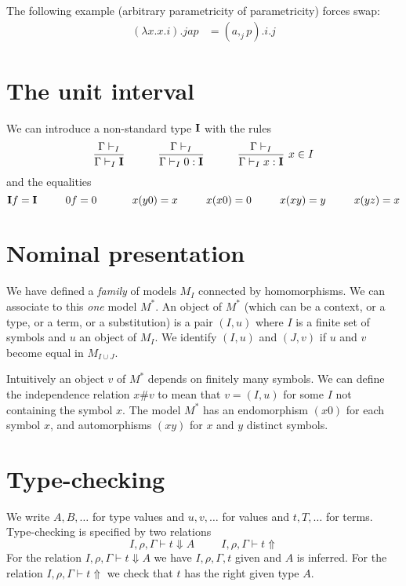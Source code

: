 \documentclass[10pt,a4paper]{article}
\newcommand{\UI}{{\bf I}}
\begin{document}
The following example (arbitrary parametricity of parametricity) forces swap:
\begin{align*}
  (λx. x.i).j a p &= (a ,_j p).i.j
\end{align*}

\section{The unit interval}
 
 We can introduce a non-standard type $\UI$ with the rules
$$
\frac{\Gamma\vdash_I}{\Gamma\vdash_I \UI}~~~~~~~~~\frac{\Gamma\vdash_I}{\Gamma\vdash_I 0:\UI}~~~~~~~~~
\frac{\Gamma\vdash_I}{\Gamma\vdash_I x:\UI}~{x\in I}
$$
and the equalities
$$
\UI f = \UI~~~~~~~~0f = 0~~~~~~~~~~x(y0) = x~~~~~~~~x(x0) = 0~~~~~~~~x(xy) = y~~~~~~~~x(yz) = x
$$



\section{Nominal presentation}

 We have defined a {\em family} of models $M_I$ connected by homomorphisms.
We can associate to this {\em one} model $M^*$. An object of $M^*$ (which can
be a context, or a type, or a term, or a substitution) is a pair $(I,u)$
where $I$ is a finite set of symbols and $u$ an object of $M_I$. We identify
$(I,u)$ and $(J,v)$ if $u$ and $v$ become equal in $M_{I\cup J}$.

\medskip

 Intuitively an object $v$ of $M^*$ depends on finitely many symbols. We can 
define the independence relation $x\#v$ to mean that $v = (I,u)$ for some $I$
not containing the symbol $x$.
The model $M^*$ has an endomorphism $(x0)$ for each symbol $x$, and automorphisms
$(xy)$ for $x$ and $y$ distinct symbols.

\section{Type-checking}

 We write $A,B,\dots$ for type values and $u,v,\dots$ for values and $t,T,\dots$ for terms.
Type-checking is specified by two relations
$$
I,\rho,\Gamma\vdash t\Downarrow A~~~~~~~~~~~I,\rho,\Gamma\vdash t\Uparrow
$$
For the relation $I,\rho,\Gamma\vdash t\Downarrow A$ we have $I,\rho,\Gamma,t$ given and
$A$ is inferred. For the relation $I,\rho,\Gamma\vdash t\Uparrow$ we check that $t$ has
the right given type $A$.
\end{document}
